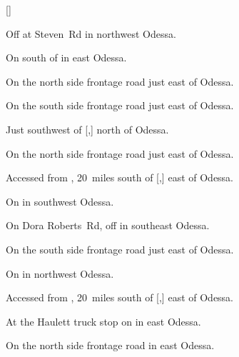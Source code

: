 
[]

\begin{LocationList}

Off  at Steven~Rd in northwest Odessa.

On  south of  in east Odessa.

\Location{\GarageHQ \Garage}
On the north side  frontage road just east of Odessa.

On the south side  frontage road just east of Odessa.

Just southwest of [,] north of Odessa.

On the north side  frontage road just east of Odessa.

Accessed from , 20~miles south of [,] east of Odessa.

On  in southwest Odessa.

On  Dora Roberts~Rd, off  in southeast Odessa.

On the south side  frontage road just east of Odessa.

On  in northwest Odessa.

Accessed from , 20~miles south of [,] east of Odessa.

At the Haulett truck stop on  in east Odessa.

On the north side  frontage road in east Odessa.

\end{LocationList}
